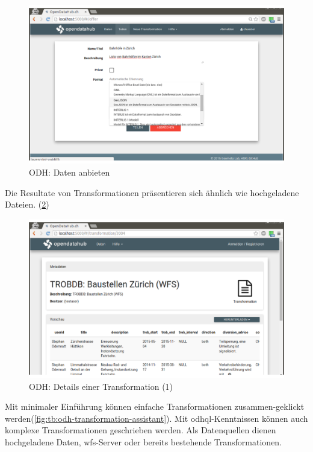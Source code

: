 \begin{figure}[H]
    \centering
    \includegraphics[width=2\linewidth/3]{fig/odh-offer-data}
    \caption{ODH: Daten anbieten}
    \label{fig:tb:odh-offer-data}
\end{figure}

Die Resultate von Transformationen präsentieren sich ähnlich wie hochgeladene Dateien.
(\cref{fig:tb:odh-transformation-detail})
\begin{figure}
    \centering
    \includegraphics[width=2\linewidth/3]{fig/odh-transformation-detail}
    \caption{ODH: Details einer Transformation (1)}
    \label{fig:tb:odh-transformation-detail}
\end{figure}

Mit minimaler Einführung können einfache Transformationen zusammen-geklickt werden(\cref{fig:tb:odh-transformation-assistant}). Mit \acs{odhql}-Kenntnissen können auch komplexe Transformationen geschrieben werden. Als Datenquellen dienen hochgeladene Daten, \acs{wfs}-Server oder bereits bestehende Transformationen.

